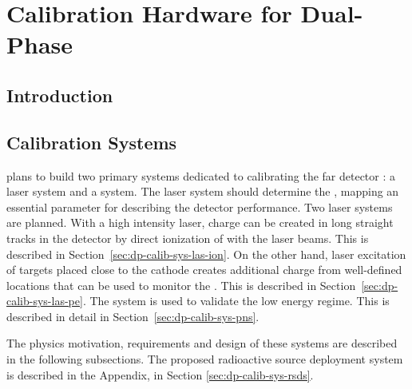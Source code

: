 \chapter{Calibration Hardware for Dual-Phase}
\label{ch:dp-calib}



\section{Introduction}
\label{sec:dp-calib-ov}




\section{Calibration Systems}
\label{sec:dp-calib-sys}

 plans to build two primary systems dedicated to calibrating the  far detector : a laser system
and a  system. The laser system should determine the \efield, mapping an essential parameter for describing the detector performance. 
Two laser systems are planned. 
With a high intensity laser, charge can be created in long straight tracks in the detector by direct ionization of  with the laser beams. This is described in Section~\ref{sec:dp-calib-sys-las-ion}. 
On the other hand, laser excitation of targets placed close to the cathode creates additional charge from well-defined locations that can be used to monitor the . This is described in Section~\ref{sec:dp-calib-sys-las-pe}. 
The  system is used to validate the low energy regime. This is described in detail in Section~\ref{sec:dp-calib-sys-pns}.

The physics motivation, requirements and design of these systems are described in the following subsections. 
The proposed radioactive source deployment system is described in the Appendix, in Section \ref{sec:dp-calib-sys-rsds}.


